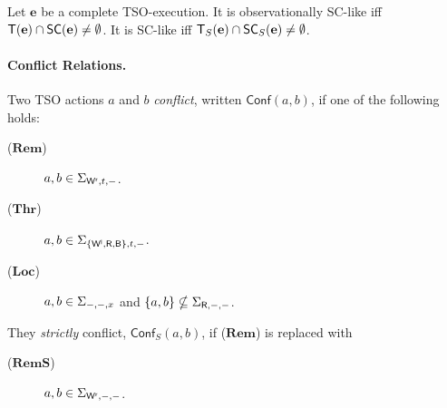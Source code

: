 \begin{proposition}
Let $\mathbf{e}$ be a complete TSO-execution.
It is observationally SC-like iff $\mathsf{T}(\mathbf{e}) \cap \mathsf{SC}(\mathbf{e}) \neq \emptyset$.
It is SC-like iff $\mathsf{T}_S(\mathbf{e}) \cap \mathsf{SC}_S(\mathbf{e}) \neq \emptyset$.
\end{proposition}


\newcommand{\independent}{\ensuremath{\nleftarrow}}
\newcommand{\independentstrict}{\ensuremath{\independent_S}}
\newcommand{\rulelocal}{(\ensuremath{\mathbf{Loc}})}
\newcommand{\rulereml}{(\ensuremath{\mathbf{RemL}})}
\newcommand{\ruleremr}{(\ensuremath{\mathbf{RemR}})}

\newcommand{\rulethr}{(\ensuremath{\mathbf{Thr}})}
\newcommand{\rulemat}{(\ensuremath{\mathbf{Mat}})}
\newcommand{\ruleloc}{(\ensuremath{\mathbf{Loc}})}
\newcommand{\rulerem}{(\ensuremath{\mathbf{Rem}})}
\newcommand{\ruleremstrict}{(\ensuremath{\mathbf{RemS}})}
\newcommand{\aliconflict}{\ensuremath{\mathsf{Conf}}}
\newcommand{\aliconflictstrict}{\ensuremath{\aliconflict_S}}

\newcommand{\shuffleset}{\ensuremath{\mathsf{Shuff}}}
\newcommand{\shufflesetx}[1]{\ensuremath{\shuffleset(#1)}}

\paragraph{Conflict Relations.}
Two TSO actions $a$ and $b$ {\em conflict}, written $\aliconflict(a,b)$, if one of the following holds:
\begin{description}
\item[\rulerem] $a,b\in\Sigma_{\mathsf{W}^{\mathsf{r}},t,-}$.
\item[\rulethr] $a,b\in\Sigma_{\{\mathsf{W}^{\mathsf{l}},\mathsf{R},\mathsf{B}\},t,-}$.
\item[\ruleloc] $a,b\in\Sigma_{-,-,x}$ and $\{a,b\}\nsubseteq\Sigma_{\mathsf{R},-,-}$.
\end{description}
They {\em strictly} conflict, $\aliconflictstrict(a,b)$, if {\rulerem} is replaced with
\begin{description}
\item[\ruleremstrict] $a,b\in\Sigma_{\mathsf{W}^{\mathsf{r}},-,-}$.
\end{description}

